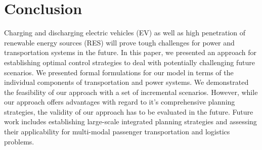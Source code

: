 \section{Conclusion}
\label{conclusion}

Charging and discharging electric vehicles (EV) as well as high penetration of renewable energy sources (RES) will prove tough challenges for power and transportation systems in the future. In this paper, we presented an approach for establishing optimal control strategies to deal with potentially challenging future scenarios. We presented formal formulations for our model in terms of the individual components of transportation and power systems. We demonstrated the feasibility of our approach with a set of incremental scenarios. However, while our approach offers advantages with regard to it's comprehensive planning strategies, the validity of our approach has to be evaluated in the future. Future work includes establishing large-scale integrated planning strategies and assessing their applicability for multi-modal passenger transportation and logistics problems.
